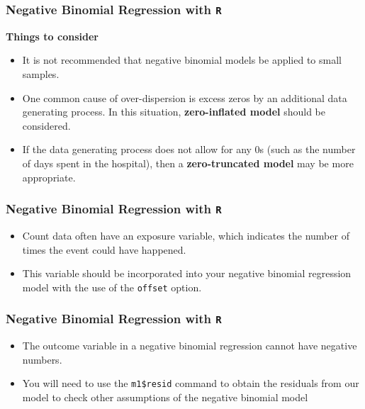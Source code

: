 \documentclass[MASTER.tex]{subfiles}
\begin{document}
\begin{frame}[fragile]
	\frametitle{Negative Binomial Regression with \texttt{R} }
	\Large
	
	\textbf{Things to consider}
	\begin{itemize}
	\item It is not recommended that negative binomial models be applied to small samples.
	\item One common cause of over-dispersion is excess zeros by an additional data generating process. 
	In this situation, \textbf{zero-inflated model} should be considered.
	\item	
	If the data generating process does not allow for any 0s (such as the number of days spent in the hospital), then a \textbf{zero-truncated model} may be more appropriate.
	\end{itemize}
\end{frame}

\begin{frame}[fragile]
	\frametitle{Negative Binomial Regression with \texttt{R} }
	\Large
	\begin{itemize}
	\item
	Count data often have an exposure variable, which indicates the number of times the event could have happened. 
	\item This variable should be incorporated into your negative binomial regression model with the 
	use of the \texttt{offset} option. 
	\end{itemize}
\end{frame}
\begin{frame}[fragile]
	\frametitle{Negative Binomial Regression with \texttt{R} }
	\Large
		\begin{itemize}
	\item
	The outcome variable in a negative binomial regression cannot have negative numbers.
	\item You will need to use the \texttt{m1\$resid} command to obtain the residuals from our model to check 
	other assumptions of the negative binomial model 
	\end{itemize}
\end{frame}


\end{document}
